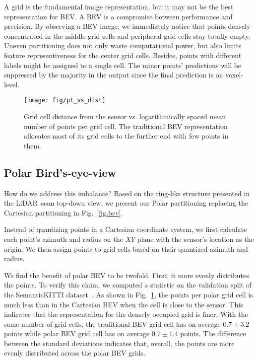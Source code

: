\documentclass[10pt,twocolumn,letterpaper]{article}
\newcommand{\lidar}{\mbox{LiDAR }}
\begin{document}
A grid is the fundamental image representation, but it may not be the best representation for BEV. A BEV is a compromise between performance and precision. By observing a BEV image, we immediately notice that points densely concentrated in the middle grid cells and peripheral grid cells stay totally empty. Uneven partitioning does not only waste computational power, but also limits feature representiveness for the center grid cells. Besides, points with different labels might be assigned to a single cell. The minor points' predictions will be suppressed by the majority in the output since the final prediction is on voxel-level. 

\begin{figure}
  \centering
  \texttt{[image: fig/pt\_vs\_dist]}
  \vspace{-4pt}
  \caption{Grid cell distance from the sensor vs. logarithmically spaced mean number of points per grid cell. The traditional BEV representation allocates most of its grid cells to the further end with few points in them.}
  \label{fig:pt_vs_dist}
  \vspace{-15pt}
\end{figure}

\subsection{Polar Bird's-eye-view}

How do we address this imbalance? Based on the ring-like structure presented in the \lidar scan top-down view, we present our Polar partitioning replacing the Cartesian partitioning in Fig.~\ref{fig.bev}.

 Instead of quantizing points in a Cartesian coordinate system, we first calculate each point's azimuth and radius on the $XY$ plane with the sensor's location as the origin. We then assign points to grid cells based on their quantized azimuth and radius.
 
 We find the benefit of polar BEV to be twofold. First, it more evenly distributes the points. To verify this claim, we computed a statistic on the validation split of the SemanticKITTI dataset~\cite{behley2019iccv}. As shown in Fig.~\ref{fig:pt_vs_dist}, the points per polar grid cell is much less than in the Cartesian BEV when the cell is close to the sensor. This indicates that the representation for the densely occupied grid is finer.  With the same number of grid cells, the traditional BEV grid cell has on average $0.7\pm3.2$ points while polar BEV grid cell has on average $0.7\pm1.4$ points. The difference between the standard deviations indicates that, overall, the points are more evenly distributed across the polar BEV grids.
 
\end{document}
